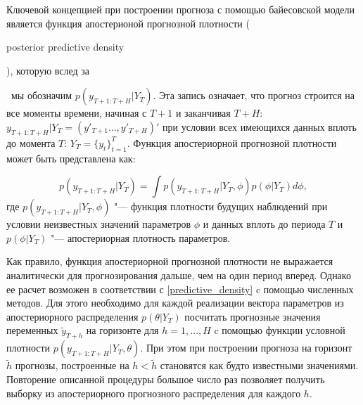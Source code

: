 \documentclass[11pt]{article} %
\newcommand{\eng}[1]{\begin{otherlanguage}{english}#1\end{otherlanguage}}
\begin{document}
Ключевой концепцией при построении прогноза с помощью байесовской модели является функция апостерионой прогнозной плотности (\eng{posterior predictive density}), которую вслед за \eng{\cite{karlsson_2012}}~мы обозначим $p(y_{T+1:T+H}|Y_{T})$. Эта запись означает, что прогноз строится на все моменты времени, начиная с $T+1$ и заканчивая $T+H$: $y_{T+1:T+H}|Y_{T}=(y'_{T+1}\ldots, y'_{T+H} )'$ при условии всех имеющихся данных вплоть до момента $T$: $Y_T=\lbrace y_t\rbrace _{t=1}^{T}$. Функция апостериорной прогнозной плотности может быть представлена как:

\begin{equation}\label{predictive_density}
p(y_{T+1:T+H}|Y_{T})=\int p(y_{T+1:T+H}|Y_{T},\phi) p(\phi |Y_T) d\phi,
\end{equation}
где $p(y_{T+1:T+H}|Y_{T},\phi)$ "--- функция плотности будущих наблюдений при условии неизвестных значений параметров $\phi$ и данных вплоть до периода $T$ и $p(\phi |Y_T)$ "--- апостериорная плотность параметров.

Как правило, функция апостериорной прогнозной плотности не выражается аналитически для прогнозирования дальше, чем на один период вперед. Однако ее расчет возможен в соответствии с \eqref{predictive_density} c помощью численных методов. Для этого необходимо для каждой реализации вектора параметров из апостериорного распределения $p(\theta |Y_T)$ посчитать прогнозные значения переменных $\tilde y_{T+h}$ на горизонте для $h=1,\ldots, H$ c помощью функции условной плотности $p(y_{T+1:T+H}|Y_{T},\theta)$. При этом при построении прогноза на горизонт $\tilde h$ прогнозы, построенные на $h<\tilde h$ становятся как будто известными значениями. Повторение описанной процедуры большое число раз позволяет получить выборку из апостериорного прогнозного распределения для каждого $h$.
\end{document}
